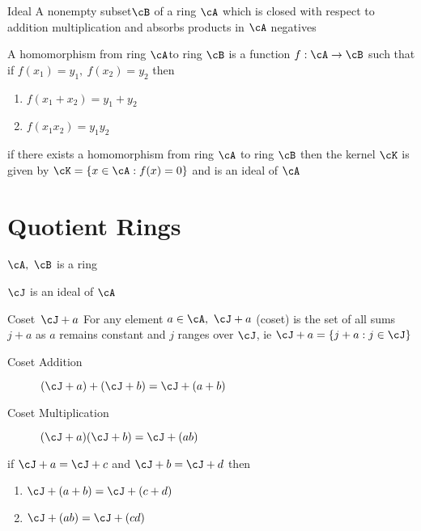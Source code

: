 \documentclass[11pt, oneside, dvipdfmx]{book}
\begin{document}
\begin{MyDefinition}{Ideal}
A nonempty subset$\cB$ of a ring  $\cA$ which is closed with respect to addition multiplication and absorbs products in $\cA$
negatives
\end{MyDefinition}

\begin{description}
\item A homomorphism from ring $\cA$to ring $\cB$ is  a function $f: \cA \rightarrow \cB$ such that if $f(x_1)=y_1,~f(x_2)=y_2$ then 
\begin{enumerate}
\item $f(x_1 +x_2) =y_1+y_2$

\item $f(x_1x_2) =y_1y_2$
\end{enumerate}

\item if there exists a homomorphism from ring $\cA$ to ring $\cB$ then the kernel $\cK$ is given by $\cK=\{ x\in \cA : f(x) =0 \}$ and is an ideal of $\cA$
\end{description}

\section{Quotient Rings}
\begin{description}
\item $\cA,~\cB$ is a ring
\item $\cJ$ is an ideal of $\cA$
\end{description}

\begin{MyDefinition}{Coset~$\cJ + a$}
For any element $a\in \cA,~\cJ + a$ (coset) is the set of all sums $j + a$ as $a$ remains constant and $j$ ranges over $\cJ$, ie $\cJ + a = \{ j+a : j \in \cJ \}$ 
\end{MyDefinition}

\begin{description}
\item[Coset Addition] $(\cJ +a)+ (\cJ + b) = \cJ+(a+b)$ 

\item[Coset Multiplication] $(\cJ +a) (\cJ + b) = \cJ+(ab)$ 
\end{description}

\begin{MyTheorem}
if $\cJ+a =\cJ + c$ and $\cJ+b = \cJ+d$ then
\begin{enumerate}
\item $\cJ+(a+b)= \cJ+(c+d)$

\item $\cJ+(ab)= \cJ+(cd)$
\end{enumerate}
\end{MyTheorem}
\end{document}
